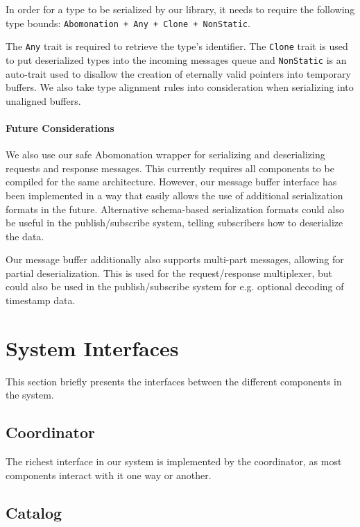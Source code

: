 In order for a type to be serialized by our library, it needs to require the
following type bounds: \lstinline{Abomonation + Any + Clone + NonStatic}.

The \lstinline{Any} trait is required to retrieve the type's identifier. The
\lstinline{Clone} trait is used to put deserialized types into the incoming
messages queue and \lstinline{NonStatic} is an auto-trait used to disallow the
creation of eternally valid pointers into temporary buffers. We also take type
alignment rules into consideration when serializing into unaligned buffers. 

\paragraph{Future Considerations}

We also use our safe Abomonation wrapper for serializing and
deserializing requests and response messages. This currently requires all
components to be compiled for the same architecture. However, our message buffer
interface has been implemented in a way that easily allows the use of additional
serialization formats in the future. Alternative schema-based serialization
formats could also be useful in the publish/subscribe system, telling subscribers
how to deserialize the data.

Our message buffer additionally also supports multi-part messages, allowing
for partial deserialization. This is used for the request/response multiplexer,
but could also be used in the publish/subscribe system for e.g. optional
decoding of timestamp data.


\section{System Interfaces}

This section briefly presents the interfaces between the different components
in the system.

\subsection{Coordinator}

The richest interface in our system is implemented by the coordinator, as most
components interact with it one way or another. 


\subsection{Catalog}






